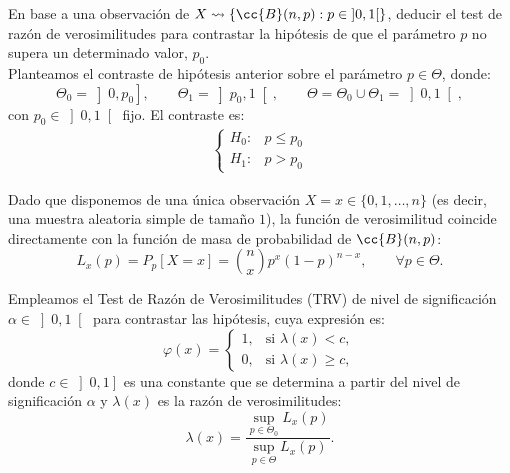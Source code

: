 \begin{ejercicio}
    En base a una observación de $X\rightsquigarrow \{\cc{B}(n,p) : p\in \left]0,1\right[\}$, deducir el test de razón de verosimilitudes para contrastar la hipótesis de que el parámetro $p$ no supera un determinado valor, $p_0$.\\

    Planteamos el contraste de hipótesis anterior sobre el parámetro $p \in \Theta$, donde:
    \begin{equation*}
        \Theta_0 = \left]0, p_0\right], \qquad \Theta_1 = \left]p_0, 1\right[, \qquad \Theta = \Theta_0 \cup \Theta_1 = \left]0, 1\right[,
    \end{equation*}
    con $p_0 \in \left]0, 1\right[$ fijo. El contraste es:
    \begin{align*}
        \begin{cases}
            H_0: & p \leq p_0 \\
            H_1: & p > p_0
        \end{cases}
    \end{align*}

    Dado que disponemos de una única observación $X = x \in \{0, 1, \ldots, n\}$ (es decir, una muestra aleatoria simple de tamaño $1$), la función de verosimilitud coincide directamente con la función de masa de probabilidad de $\cc{B}(n, p)$:
    \begin{equation*}
        L_x(p) = P_p[X = x] = \binom{n}{x} p^x (1 - p)^{n - x}, \qquad \forall p \in \Theta.
    \end{equation*}

    Empleamos el Test de Razón de Verosimilitudes (TRV) de nivel de significación $\alpha \in \left]0, 1\right[$ para contrastar las hipótesis, cuya expresión es:
    \begin{equation*}
        \varphi(x) =
        \begin{cases}
            1, & \text{si } \lambda(x) < c, \\
            0, & \text{si } \lambda(x) \geq c,
        \end{cases}
    \end{equation*}
    donde $c \in \left]0, 1\right]$ es una constante que se determina a partir del nivel de significación $\alpha$ y $\lambda(x)$ es la razón de verosimilitudes:
    \begin{equation*}
        \lambda(x) = \frac{\sup\limits_{p \in \Theta_0} L_x(p)}{\sup\limits_{p \in \Theta} L_x(p)}.
    \end{equation*}


\end{ejercicio}
